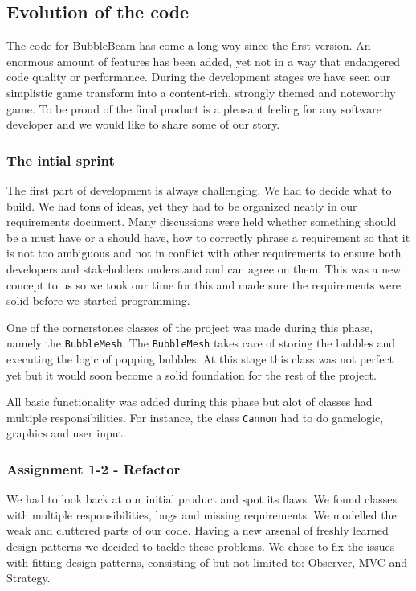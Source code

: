 \documentclass[a4paper]{article}
\begin{document}
\clearpage
\subsection {Evolution of the code}
The code for BubbleBeam has come a long way since the first version. An enormous amount of features has been added, yet not in a way that endangered code quality or performance. During the development stages we have seen our simplistic game transform into a content-rich, strongly themed and noteworthy game. To be proud of the final product is a pleasant feeling for any software developer and we would like to share some of our story.

\subsubsection{The intial sprint}
The first part of development is always challenging. We had to decide what to build. We had tons of ideas, yet they had to be organized neatly in our requirements document. Many discussions were held whether something should be a must have or a should have, how to correctly phrase a requirement so that it is not too ambiguous and not in conflict with other requirements to ensure both developers and stakeholders understand and can agree on them. This was a new concept to us so we took our time for this and made sure the requirements were solid before we started programming. 

One of the cornerstones classes of the project was made during this phase, namely the \texttt{BubbleMesh}. The \texttt{BubbleMesh} takes care of storing the bubbles and executing the logic of popping bubbles. At this stage this class was not perfect yet but it would soon become a solid foundation for the rest of the project.

All basic functionality was added during this phase but alot of classes had multiple responsibilities. For instance, the class \texttt{Cannon} had to do gamelogic, graphics and user input.

\subsubsection{Assignment 1-2 - Refactor}
We had to look back at our initial product and spot its flaws. We found classes with multiple responsibilities, bugs and missing requirements. We modelled the weak and cluttered parts of our code. Having a new arsenal of freshly learned design patterns we decided to tackle these problems. We chose to fix the issues with fitting design patterns, consisting of but not limited to: Observer, MVC and Strategy.
\end{document}
